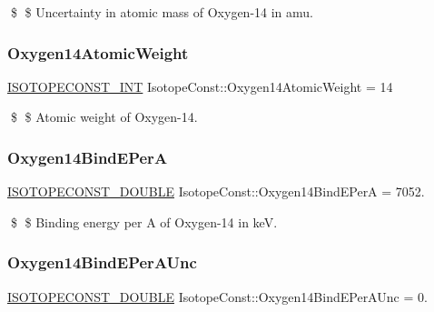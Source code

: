 \$ \$ Uncertainty in atomic mass of Oxygen-\/14 in amu. \mbox{\label{group___isotope_const-_oxygen-_o14_ga39d47a30b716fbfba67a874057327036}} 
\subsubsection{\texorpdfstring{Oxygen14\+Atomic\+Weight}{Oxygen14AtomicWeight}}
{\footnotesize\ttfamily \mbox{\hyperlink{group___isotope_const-_macros_ga5f18360b3e99483a35c32d789e62621c}{I\+S\+O\+T\+O\+P\+E\+C\+O\+N\+S\+T\+\_\+\+I\+NT}} Isotope\+Const\+::\+Oxygen14\+Atomic\+Weight = 14}

\$ \$ Atomic weight of Oxygen-\/14. \mbox{\label{group___isotope_const-_oxygen-_o14_gae279566d51f79b6ed1a88a84e2b20ce5}} 
\subsubsection{\texorpdfstring{Oxygen14\+Bind\+E\+PerA}{Oxygen14BindEPerA}}
{\footnotesize\ttfamily \mbox{\hyperlink{group___isotope_const-_macros_ga8f45a7272ce02c0b4c65c44636ed719a}{I\+S\+O\+T\+O\+P\+E\+C\+O\+N\+S\+T\+\_\+\+D\+O\+U\+B\+LE}} Isotope\+Const\+::\+Oxygen14\+Bind\+E\+PerA = 7052.}

\$ \$ Binding energy per A of Oxygen-\/14 in keV. \mbox{\label{group___isotope_const-_oxygen-_o14_ga02b4fdc68a3fd96628baa653324fd18e}} 
\subsubsection{\texorpdfstring{Oxygen14\+Bind\+E\+Per\+A\+Unc}{Oxygen14BindEPerAUnc}}
{\footnotesize\ttfamily \mbox{\hyperlink{group___isotope_const-_macros_ga8f45a7272ce02c0b4c65c44636ed719a}{I\+S\+O\+T\+O\+P\+E\+C\+O\+N\+S\+T\+\_\+\+D\+O\+U\+B\+LE}} Isotope\+Const\+::\+Oxygen14\+Bind\+E\+Per\+A\+Unc = 0.}

